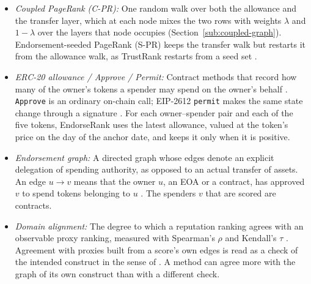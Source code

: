 \begin{itemize}
\item \emph{Coupled PageRank (C-PR):} One random walk over both the allowance and the transfer layer, which at each node mixes the two rows with weights $\lambda$ and $1-\lambda$ over the layers that node occupies (Section~\ref{sub:coupled-graph}). Endorsement-seeded PageRank (S-PR) keeps the transfer walk but restarts it from the allowance walk, as TrustRank restarts from a seed set \parencite{gyongyi2004trustrank}.
\item \emph{ERC-20 allowance / Approve / Permit:} Contract methods that record how many of the owner's tokens a spender may spend on the owner's behalf \parencite{vogelsteller2015erc20}. \texttt{Approve} is an ordinary on-chain call; EIP-2612 \texttt{permit} makes the same state change through a signature \parencite{lundfall2020permit}. For each owner--spender pair and each of the five tokens, EndorseRank uses the latest allowance, valued at the token's price on the day of the anchor date, and keeps it only when it is positive.
\item \emph{Endorsement graph:} A directed graph whose edges denote an explicit delegation of spending authority, as opposed to an actual transfer of assets. An edge $u \to v$ means that the owner $u$, an EOA or a contract, has approved $v$ to spend tokens belonging to $u$ \parencite{vogelsteller2015erc20}. The spenders $v$ that are scored are contracts.
\item \emph{Domain alignment:} The degree to which a reputation ranking agrees with an observable proxy ranking, measured with Spearman's $\rho$ \parencite{spearman1904proof} and Kendall's $\tau$ \parencite{kendall1938rank}. Agreement with proxies built from a score's own edges is read as a check of the intended construct in the sense of \textcite{cronbach1955construct}. A method can agree more with the graph of its own construct than with a different check.
\end{itemize}


